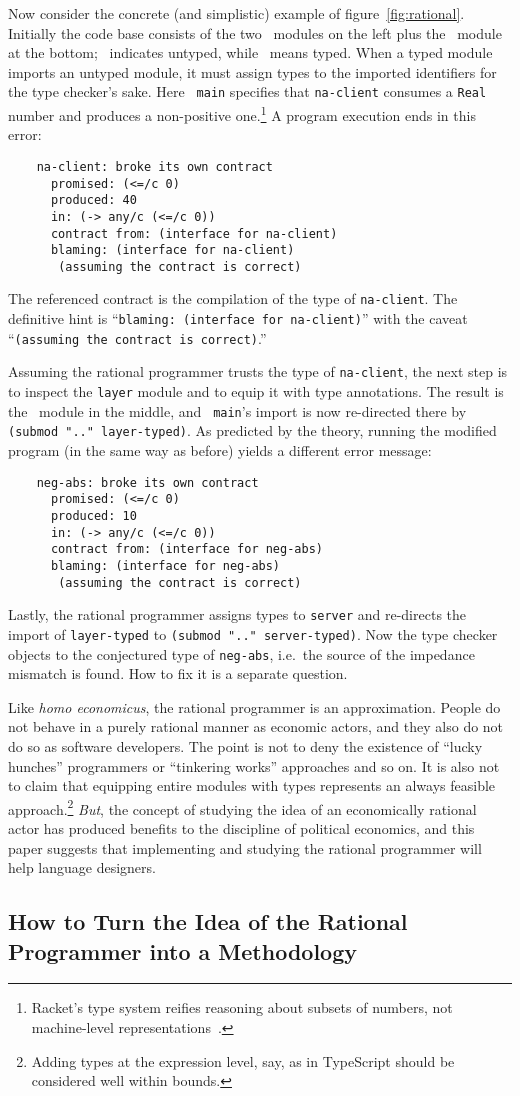 Now consider the concrete (and simplistic) example of figure~\ref{fig:rational}.
Initially the code base consists of the two \dyncolor\ modules on the left plus
the \typecolor\ module at the bottom; \dyncolor\ indicates untyped, while
\typecolor\ means typed. When a typed module imports an untyped module, it must
assign types to the imported identifiers for the type checker's sake. Here {\tt
main} specifies that {\tt na-client} consumes a {\tt Real} number and produces a
non-positive one.\footnote{Racket's type system reifies
reasoning about subsets of numbers, not machine-level
representations~\citep{stathff-padl-12}.} A program execution ends in this error:
\begin{verbatim}
    na-client: broke its own contract
      promised: (<=/c 0)
      produced: 40
      in: (-> any/c (<=/c 0))           
      contract from: (interface for na-client)
      blaming: (interface for na-client)
       (assuming the contract is correct)
\end{verbatim}
The referenced contract is the compilation of the type of {\tt na-client}. The
definitive hint is ``{\tt blaming: (interface for na-client)}'' with the caveat
``{\tt (assuming the contract is correct)}.''

Assuming the rational programmer trusts the type of {\tt na-client}, the next
step is to inspect the {\tt layer} module and to equip it with type
annotations. The result is the \typecolor\ module in the middle, and {\tt
main}'s import is now re-directed there by {\tt (submod ".." layer-typed)}. As
predicted by the theory, running the modified program (in the same way as before) yields a different error message:
\begin{verbatim}
    neg-abs: broke its own contract
      promised: (<=/c 0)
      produced: 10
      in: (-> any/c (<=/c 0))
      contract from: (interface for neg-abs)
      blaming: (interface for neg-abs)
       (assuming the contract is correct)
\end{verbatim}
Lastly, the rational programmer assigns types to {\tt server} and re-directs
the import of {\tt layer-typed} to {\tt (submod ".." server-typed)}. Now the
type checker objects to the conjectured type of {\tt neg-abs}, i.e.\ the source
of the impedance mismatch is found. How to fix it is a separate question.

Like {\it homo economicus\/}, the rational programmer is an approximation.
People do not behave in a purely rational manner as economic actors, and they
also do not do so as software developers. The point is not to deny the existence
of ``lucky hunches'' programmers or ``tinkering works'' approaches and so on. It
is also not to claim that equipping entire modules with types represents an
always feasible approach.\footnote{Adding types at the expression level, say, as
in TypeScript should be considered well within bounds.}  {\em But\/}, the
concept of studying the idea of an economically rational actor has produced
benefits to the discipline of political economics, and this paper suggests that
implementing and studying the rational programmer will help language designers.

\subsection{How to Turn the Idea of the Rational Programmer into a Methodology} 
\label{sub:methodology}


